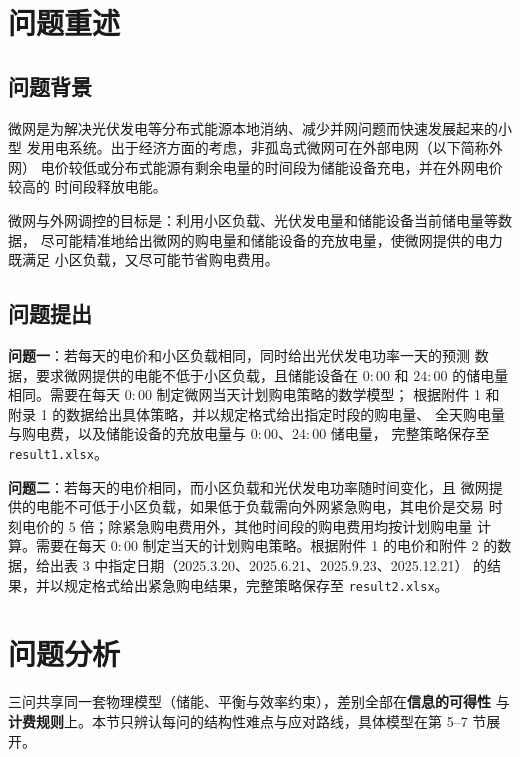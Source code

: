 \documentclass[withoutpreface,bwprint]{cumcmthesis}
\begin{document}
\section{问题重述}

\subsection{问题背景}

微网是为解决光伏发电等分布式能源本地消纳、减少并网问题而快速发展起来的小型
发用电系统。出于经济方面的考虑，非孤岛式微网可在外部电网（以下简称外网）
电价较低或分布式能源有剩余电量的时间段为储能设备充电，并在外网电价较高的
时间段释放电能。

微网与外网调控的目标是：利用小区负载、光伏发电量和储能设备当前储电量等数据，
尽可能精准地给出微网的购电量和储能设备的充放电量，使微网提供的电力既满足
小区负载，又尽可能节省购电费用。

\subsection{问题提出}

\textbf{问题一}：若每天的电价和小区负载相同，同时给出光伏发电功率一天的预测
数据，要求微网提供的电能不低于小区负载，且储能设备在 $0{:}00$ 和 $24{:}00$
的储电量相同。需要在每天 $0{:}00$ 制定微网当天计划购电策略的数学模型；
根据附件 1 和附录 1 的数据给出具体策略，并以规定格式给出指定时段的购电量、
全天购电量与购电费，以及储能设备的充放电量与 $0{:}00$、$24{:}00$ 储电量，
完整策略保存至 \texttt{result1.xlsx}。

\textbf{问题二}：若每天的电价相同，而小区负载和光伏发电功率随时间变化，且
微网提供的电能不可低于小区负载，如果低于负载需向外网紧急购电，其电价是交易
时刻电价的 $5$ 倍；除紧急购电费用外，其他时间段的购电费用均按计划购电量
计算。需要在每天 $0{:}00$ 制定当天的计划购电策略。根据附件 1 的电价和附件 2
的数据，给出表 3 中指定日期（2025.3.20、2025.6.21、2025.9.23、2025.12.21）
的结果，并以规定格式给出紧急购电结果，完整策略保存至 \texttt{result2.xlsx}。

\section{问题分析}

三问共享同一套物理模型（储能、平衡与效率约束），差别全部在\textbf{信息的可得性}
与\textbf{计费规则}上。本节只辨认每问的结构性难点与应对路线，具体模型在第 5--7
节展开。
\end{document}
